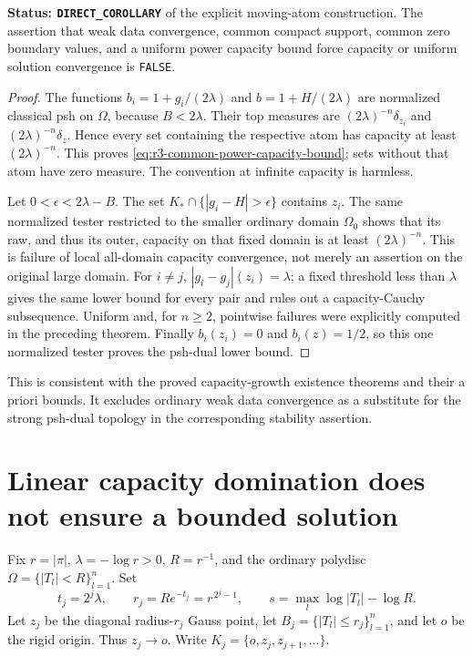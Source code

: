 \documentclass[11pt,a4paper]{article}
\numberwithin{equation}{section}
\theoremstyle{definition}
\theoremstyle{remark}
\begin{document}
\noindent\textbf{Status: \texttt{DIRECT\_COROLLARY}} of the
explicit moving-atom construction. The assertion that weak data
convergence, common compact support, common zero boundary values,
and a uniform power capacity bound force capacity or uniform
solution convergence is \texttt{FALSE}.

\begin{proof}
The functions $b_i=1+g_i/(2\lambda)$ and
$b=1+H/(2\lambda)$ are normalized classical psh on $\Omega$,
because $B<2\lambda$. Their top measures are
$(2\lambda)^{-n}\delta_{z_i}$ and
$(2\lambda)^{-n}\delta_z$. Hence every set containing the
respective atom has capacity at least $(2\lambda)^{-n}$.
This proves \eqref{eq:r3-common-power-capacity-bound}; sets
without that atom have zero measure. The convention at infinite
capacity is harmless.

Let $0<\epsilon<2\lambda-B$. The set
$K_*\cap\{|g_i-H|>\epsilon\}$ contains $z_i$.
The same normalized tester restricted to the smaller ordinary
domain $\Omega_0$ shows that its raw, and thus its outer,
capacity on that fixed domain is at least $(2\lambda)^{-n}$.
This is failure of local all-domain capacity convergence, not
merely an assertion on the original large domain.
For $i\ne j$, $|g_i-g_j|(z_i)=\lambda$; a fixed threshold less
than $\lambda$ gives the same lower bound for every pair and
rules out a capacity-Cauchy subsequence. Uniform and, for
$n\geq2$, pointwise failures were explicitly computed in the
preceding theorem. Finally $b_i(z_i)=0$ and $b_i(z)=1/2$,
so this one normalized tester proves the psh-dual lower bound.
\end{proof}

This is consistent with the proved capacity-growth existence
theorems and their a priori bounds. It excludes ordinary weak
data convergence as a substitute for the strong psh-dual
topology in the corresponding stability assertion.



\section{Linear capacity domination does not ensure a bounded solution}
\label{sec:r3-linear-capacity-obstruction}

Fix $r=|\pi|$, $\lambda=-\log r>0$, $R=r^{-1}$, and the
ordinary polydisc $\Omega=\{|T_l|<R\}_{l=1}^n$. Set
\[
 t_j=2^j\lambda,\qquad r_j=R e^{-t_j}=r^{\,2^j-1},\qquad
 s=\max_l\log|T_l|-\log R .
\]
Let $z_j$ be the diagonal radius-$r_j$ Gauss point, let
$B_j=\{|T_l|\leq r_j\}_{l=1}^n$, and let $o$ be the rigid origin.
Thus $z_j\to o$. Write $K_j=\{o,z_j,z_{j+1},\ldots\}$.
\end{document}
